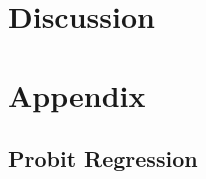 \label{sec:experiments}

\section{Discussion}
\label{sec:discussion}


\section{Appendix}
%
\subsection{Probit Regression}
\label{sec:probit_review}



